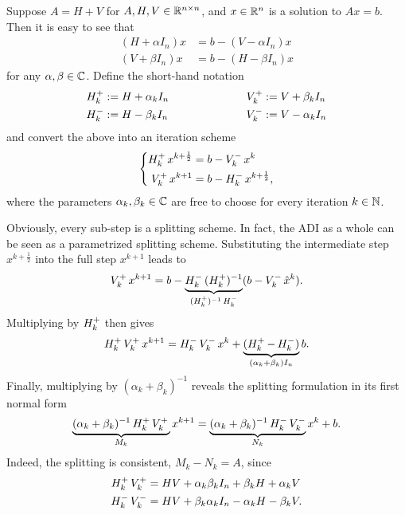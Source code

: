 Suppose $A=H+V$ for $A, H, V \in \mathbb{R}^{n\times n}$,
and $x\in\mathbb{R}^n$ is a solution to $Ax=b$.
Then it is easy to see that
\begin{equation}
\begin{aligned}
  (H + \alpha I_n)x &= b - (V - \alpha I_n) x \\
  (V + \beta I_n)x &= b - (H - \beta I_n) x
\end{aligned}
\end{equation}
for any $\alpha, \beta \in\mathbb{C}$.
Define the short-hand notation
\begin{equation}
\label{eq:adi:shorthand}
\begin{aligned}
  \Aip  &:= H + \alpha_k I_n &
  \qquad\qquad\qquad %
  \Aiip &:= V + \beta_k  I_n \\
  \Aim  &:= H - \beta_k  I_n &
  \Aiim &:= V - \alpha_k I_n
\end{aligned}
\end{equation}
and convert the above into an iteration scheme
\begin{equation}
  \label{eq:adi:general2step}
  \left\{
  \begin{aligned}
    \mathop{H_k^+}  x^{k+\frac{1}{2}} &= b - \mathop{V_k^-} x^k \\
    \mathop{V_k^+} x^{k+1}           &= b - \mathop{H_k^-} x^{k+\frac{1}{2}}
    ,
  \end{aligned}
  \right.
\end{equation}
where the parameters $\alpha_k, \beta_k \in\mathbb{C}$ are free to choose for every iteration $k\in\mathbb{N}$.

Obviously, every sub-step is a splitting scheme.
In fact, the \ac{ADI} as a whole can be seen as a parametrized splitting scheme.
Substituting the intermediate step $x^{k+\frac{1}{2}}$ into the full step $x^{k+1}$ leads to
\begin{equation}
  \mathop{V_k^+} x^{k+1}
  = b - \underbrace{
    \mathop{H_k^-}\mathop{(\mathop{H_k^+})^{-1}}
  }_{\mathop{(\mathop{H_k^+})^{-1}}\mathop{H_k^-}}
  (b - \mathop{V_k^-} \hat x^k)
  .
\end{equation}
Multiplying by $\mathop{H_k^+}$ then gives
\begin{equation}
  \Aip\Aiip x^{k+1} = \Aim\Aiim x^k +
  \underbrace{%
  (\Aip - \Aim)
  }_{(\alpha_k + \beta_k) I_n}
  b
  .
\end{equation}
Finally, multiplying by $(\alpha_k + \beta_k)^{-1}$ reveals the splitting formulation in its first normal form
\begin{equation}
\label{eq:adi:general1step}
  \underbrace{
    (\alpha_k + \beta_k)^{-1} \mathop{H_k^+}\mathop{V_k^+} \\
  }_{M_k}
  x^{k+1} =
  \underbrace{
    (\alpha_k + \beta_k)^{-1} \mathop{H_k^-}\mathop{V_k^-}
  }_{N_k}
  x^k + b
  .
\end{equation}
Indeed, the splitting is consistent, $M_k - N_k = A$, since
\begin{equation}
\begin{aligned}
  \mathop{H_k^+}\mathop{V_k^+} &= HV + \alpha_k\beta_k I_n + \beta_k H + \alpha_k V \\
  \mathop{H_k^-}\mathop{V_k^-} &= HV + \beta_k\alpha_k I_n - \alpha_k H - \beta_k V
  .
\end{aligned}
\end{equation}

